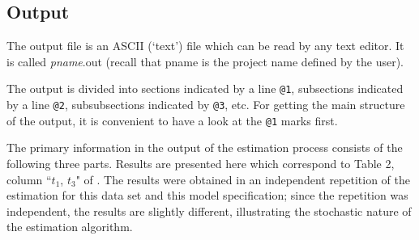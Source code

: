 \documentclass[a4paper,fleqn]{article}
\newcommand{\+}{\, + \,}
\begin{document}
{%


\subsection{Output}
\label{S_output}

The output file is an ASCII (`text') file which can be
read by any text editor.
It is called
\textsf{{\em pname}.out} (recall that {\sf pname} is the
project name defined by the user).

The output is divided into sections indicated by a line {\tt @1},
subsections indicated by a line {\tt @2}, subsubsections indicated
by {\tt @3}, etc. For getting the main structure of the output, it
is convenient to have a look at the {\tt @1} marks first.

The primary information in the output of the estimation process
consists of the following three parts. Results are presented here
which correspond to Table 2, column ``$t_1$, $t_3$" of \citet{Snijders01}.
The results were obtained in an independent repetition of
the estimation for this data set and this model specification;
since the repetition was independent, the results are slightly
different, illustrating the stochastic nature of the estimation
algorithm.\medskip

\begin{screen}
\newpage
\end{screen}
\smallskip

}
\end{document}
